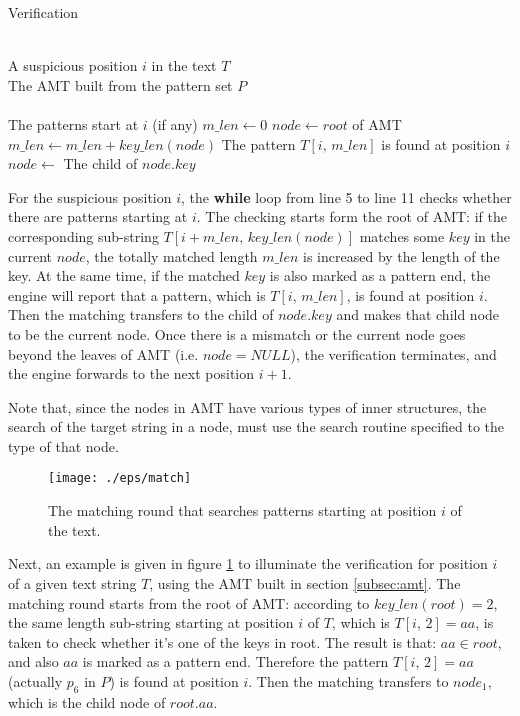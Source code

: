 \documentclass{article}
\begin{document}
\begin{algorithm}
  \caption{Verification}\scriptsize
  \label{alg:matching}
  \begin{algorithmic}[1]
    \REQUIRE ~~\\
    A suspicious position $i$ in the text $T$\\
    The AMT built from the pattern set $P$\\
    \ENSURE ~~\\
    The patterns start at $i$ (if any)
    \STATE
    \STATE $m\_len \leftarrow 0$
    \STATE $node \leftarrow root$ of AMT
    \STATE
    \STATE $m\_len \leftarrow m\_len + key\_len(node)$
    \STATE The pattern $T[i,\,m\_len]$ is found at position $i$
    \ENDIF
    \STATE $node \leftarrow$ The child of $node.key$
    \ENDWHILE
  \end{algorithmic}
\end{algorithm}

For the suspicious position $i$, the \textbf{while} loop from line 5
to line 11 checks whether there are patterns starting at $i$. The
checking starts form the root of AMT: if the corresponding sub-string
$T[i+m\_len, \, key\_len(node)]$ matches some $key$ in the current
$node$, the totally matched length $m\_len$ is increased by the length
of the key. At the same time, if the matched $key$ is also marked as a
pattern end, the engine will report that a pattern, which is
$T[i,\,m\_len]$, is found at position $i$. Then the matching transfers
to the child of $node.key$ and makes that child node to be the current
node. Once there is a mismatch or the current node goes beyond the
leaves of AMT (i.e.  $node = NULL$), the verification terminates, and
the engine forwards to the next position $i+1$.

Note that, since the nodes in AMT have various types of inner
structures, the search of the target string in a node, must use the
search routine specified to the type of that node.

\begin{figure}[htbp]
  \centering
  \texttt{[image: ./eps/match]}
  \caption{The matching round that searches patterns starting at
    position $i$ of the text.}
  \label{fig:matching}
\end{figure}

Next, an example is given in figure \ref{fig:matching} to illuminate
the verification for position $i$ of a given text string $T$, using
the AMT built in section \ref{subsec:amt}. The matching round starts
from the root of AMT: according to $key\_len(root)=2$, the same length
sub-string starting at position $i$ of $T$, which is $T[i,\,2]=aa$, is
taken to check whether it's one of the keys in root. The result is
that: $aa \in root$, and also $aa$ is marked as a pattern
end. Therefore the pattern $T[i,\,2]=aa$ (actually $p_6$ in $P$) is
found at position $i$. Then the matching transfers to $node_1$, which
is the child node of $root.aa$.
\end{document}
